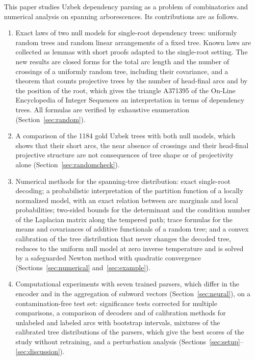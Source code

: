 \documentclass[mathematics,article,submit,pdftex,oneauthor]{Definitions/mdpi}
\begin{document}
This paper studies Uzbek dependency parsing as a problem of combinatorics and numerical analysis on spanning arborescences.
Its contributions are as follows.
\begin{enumerate}
\item Exact laws of two null models for single-root dependency trees: uniformly random trees and random linear arrangements of a fixed tree. Known laws are collected as lemmas with short proofs adapted to the single-root setting. The new results are closed forms for the total arc length and the number of crossings of a uniformly random tree, including their covariance, and a theorem that counts projective trees by the number of head-final arcs and by the position of the root, which gives the triangle A371395 of the On-Line Encyclopedia of Integer Sequences an interpretation in terms of dependency trees. All formulas are verified by exhaustive enumeration (Section~\ref{sec:random}).
\item A comparison of the 1184 gold Uzbek trees with both null models, which shows that their short arcs, the near absence of crossings and their head-final projective structure are not consequences of tree shape or of projectivity alone (Section~\ref{sec:randomcheck}).
\item Numerical methods for the spanning-tree distribution: exact single-root decoding; a probabilistic interpretation of the partition function of a locally normalized model, with an exact relation between arc marginals and local probabilities; two-sided bounds for the determinant and the condition number of the Laplacian matrix along the tempered path; trace formulas for the means and covariances of additive functionals of a random tree; and a convex calibration of the tree distribution that never changes the decoded tree, reduces to the uniform null model at zero inverse temperature and is solved by a safeguarded Newton method with quadratic convergence (Sections~\ref{sec:numerical} and~\ref{sec:example}).
\item Computational experiments with seven trained parsers, which differ in the encoder and in the aggregation of subword vectors (Section~\ref{sec:neural}), on a contamination-free test set: significance tests corrected for multiple comparisons, a comparison of decoders and of calibration methods for unlabeled and labeled arcs with bootstrap intervals, mixtures of the calibrated tree distributions of the parsers, which give the best scores of the study without retraining, and a perturbation analysis (Sections~\ref{sec:setup}--\ref{sec:discussion}).
\end{enumerate}
\end{document}
